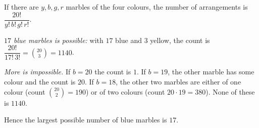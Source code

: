 If there are $y,b,g,r$ marbles of the four colours, the number of arrangements is $\dfrac{20!}{y!\,b!\,g!\,r!}$.

\emph{$17$ blue marbles is possible:} with $17$ blue and $3$ yellow, the count is $\dfrac{20!}{17!\,3!}=\binom{20}{3}=1140$.

\emph{More is impossible.} If $b=20$ the count is $1$. If $b=19$, the other marble has some colour and the count is $20$. If $b=18$, the other two marbles are either of one colour (count $\binom{20}2=190$) or of two colours (count $20\cdot19=380$). None of these is $1140$.

Hence the largest possible number of blue marbles is $\boxed{17}$.
